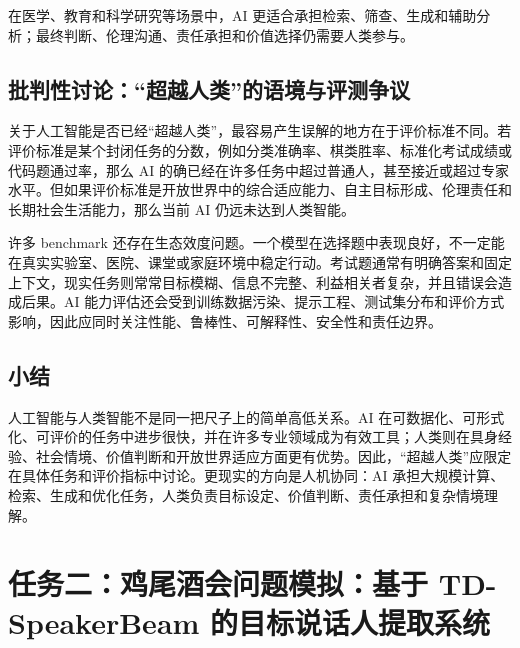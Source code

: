 \documentclass[UTF8,zihao=5,a4paper]{ctexart}
\begin{document}
在医学、教育和科学研究等场景中，AI 更适合承担检索、筛查、生成和辅助分析；最终判断、伦理沟通、责任承担和价值选择仍需要人类参与。

\subsection{批判性讨论：“超越人类”的语境与评测争议}

关于人工智能是否已经“超越人类”，最容易产生误解的地方在于评价标准不同。若评价标准是某个封闭任务的分数，例如分类准确率、棋类胜率、标准化考试成绩或代码题通过率，那么 AI 的确已经在许多任务中超过普通人，甚至接近或超过专家水平。但如果评价标准是开放世界中的综合适应能力、自主目标形成、伦理责任和长期社会生活能力，那么当前 AI 仍远未达到人类智能。

许多 benchmark 还存在生态效度问题。一个模型在选择题中表现良好，不一定能在真实实验室、医院、课堂或家庭环境中稳定行动。考试题通常有明确答案和固定上下文，现实任务则常常目标模糊、信息不完整、利益相关者复杂，并且错误会造成后果。AI 能力评估还会受到训练数据污染、提示工程、测试集分布和评价方式影响，因此应同时关注性能、鲁棒性、可解释性、安全性和责任边界。

\subsection{小结}

人工智能与人类智能不是同一把尺子上的简单高低关系。AI 在可数据化、可形式化、可评价的任务中进步很快，并在许多专业领域成为有效工具；人类则在具身经验、社会情境、价值判断和开放世界适应方面更有优势。因此，“超越人类”应限定在具体任务和评价指标中讨论。更现实的方向是人机协同：AI 承担大规模计算、检索、生成和优化任务，人类负责目标设定、价值判断、责任承担和复杂情境理解。

\newpage

\section{任务二：鸡尾酒会问题模拟：基于 TD-SpeakerBeam 的目标说话人提取系统}
\end{document}
